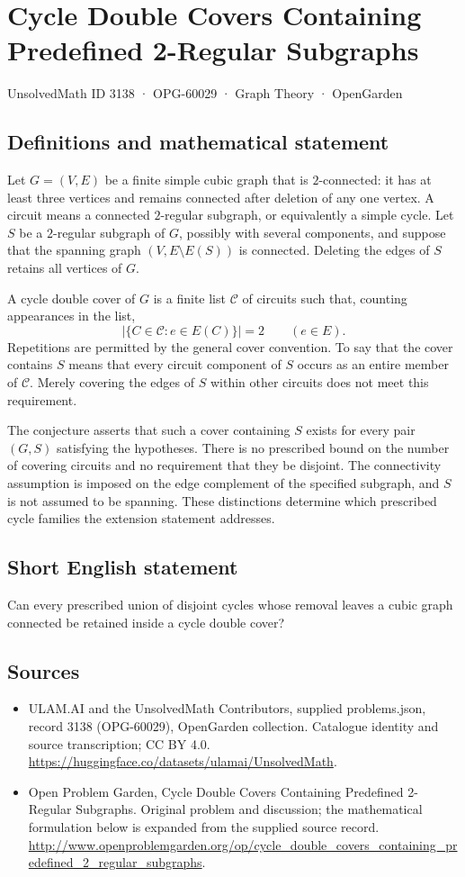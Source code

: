 \documentclass[11pt,a4paper]{article}
\begin{document}
\section*{Cycle Double Covers Containing Predefined 2-Regular Subgraphs}\label{3138}
{\small UnsolvedMath ID 3138 · OPG-60029 · Graph Theory · OpenGarden}
\subsection{Definitions and mathematical statement}
Let $G=(V,E)$ be a finite simple cubic graph that is $2$-connected:
it has at least three vertices and remains connected after deletion
of any one vertex. A circuit means a connected $2$-regular subgraph,
or equivalently a simple cycle. Let $S$ be a $2$-regular subgraph
of $G$, possibly with several components, and suppose that the
spanning graph $(V,E\setminus E(S))$ is connected. Deleting the edges
of $S$ retains all vertices of $G$.

A cycle double cover of $G$ is a finite list $\mathcal C$ of circuits
such that, counting appearances in the list,
\[
 \bigl|\{C\in\mathcal C:e\in E(C)\}\bigr|=2
 \qquad(e\in E).
\]
Repetitions are permitted by the general cover convention. To say
that the cover contains $S$ means that every circuit component of
$S$ occurs as an entire member of $\mathcal C$. Merely covering the
edges of $S$ within other circuits does not meet this requirement.

The conjecture asserts that such a cover containing $S$ exists for
every pair $(G,S)$ satisfying the hypotheses. There is no prescribed
bound on the number of covering circuits and no requirement that
they be disjoint. The connectivity assumption is imposed on the
edge complement of the specified subgraph, and $S$ is not assumed
to be spanning. These distinctions determine which prescribed
cycle families the extension statement addresses.
\subsection{Short English statement}
Can every prescribed union of disjoint cycles whose removal leaves a cubic graph connected be retained inside a cycle double cover?
\subsection{Sources}
\begin{itemize}
\item[S1] ULAM.AI and the UnsolvedMath Contributors, supplied problems.json, record 3138 (OPG-60029), OpenGarden collection. Catalogue identity and source transcription; CC BY 4.0.
\url{https://huggingface.co/datasets/ulamai/UnsolvedMath}.
\item[S2] Open Problem Garden, Cycle Double Covers Containing Predefined 2-Regular Subgraphs. Original problem and discussion; the mathematical formulation below is expanded from the supplied source record.
\url{http://www.openproblemgarden.org/op/cycle_double_covers_containing_predefined_2_regular_subgraphs}.
\end{itemize}
\end{document}
